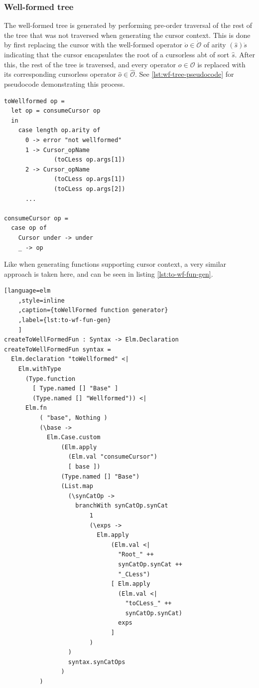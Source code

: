 \subsubsection{Well-formed tree}

The well-formed tree is generated by performing pre-order traversal of the
rest of the tree that was not traversed when generating the cursor context.
This is done by first replacing the cursor with the well-formed operator
$\dot{o} \in \dot{\mathcal{O}}$ of arity $(\hat{s})\dot{s}$ indicating that the
cursor encapsulates the root of a cursorless abt of sort $\hat{s}$.
After this, the rest of the tree is traversed, and every operator $o \in \mathcal{O}$
is replaced with its corresponding cursorless operator $\hat{o} \in \hat{\mathcal{O}}$.
See \cref{lst:wf-tree-pseudocode} for pseudocode demonstrating this process.

\begin{lstlisting}[caption={Pseudocode for generating well-formed tree},label={lst:wf-tree-pseudocode}, style=inline]
toWellformed op =
  let op = consumeCursor op
  in
    case length op.arity of
      0 -> error "not wellformed"
      1 -> Cursor_opName
              (toCLess op.args[1])
      2 -> Cursor_opName
              (toCLess op.args[1])
              (toCLess op.args[2])
      ...

consumeCursor op =
  case op of
    Cursor under -> under
    _ -> op
\end{lstlisting}

Like when generating functions supporting cursor context, a very similar approach
is taken here, and can be seen in listing \cref{lst:to-wf-fun-gen}.

\begin{lstlisting}[language=elm
    ,style=inline
    ,caption={toWellFormed function generator}
    ,label={lst:to-wf-fun-gen}
    ]
createToWellFormedFun : Syntax -> Elm.Declaration
createToWellFormedFun syntax =
  Elm.declaration "toWellformed" <|
    Elm.withType 
      (Type.function 
        [ Type.named [] "Base" ] 
        (Type.named [] "Wellformed")) <|
      Elm.fn
          ( "base", Nothing )
          (\base ->
            Elm.Case.custom
                (Elm.apply 
                  (Elm.val "consumeCursor") 
                  [ base ])
                (Type.named [] "Base")
                (List.map
                  (\synCatOp ->
                    branchWith synCatOp.synCat
                        1
                        (\exps ->
                          Elm.apply
                              (Elm.val <| 
                                "Root_" ++ 
                                synCatOp.synCat ++ 
                                "_CLess")
                              [ Elm.apply 
                                (Elm.val <| 
                                  "toCLess_" ++ 
                                  synCatOp.synCat) 
                                exps 
                              ]
                        )
                  )
                  syntax.synCatOps
                )
          )
\end{lstlisting}

